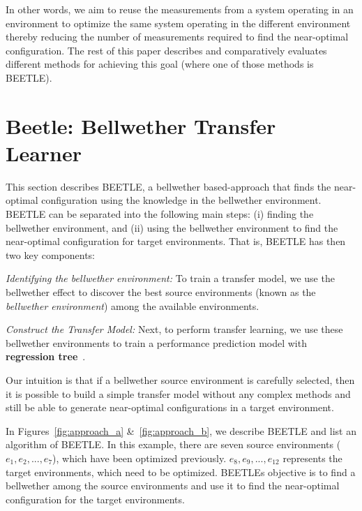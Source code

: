 \documentclass[10pt,journal,compsoc]{IEEEtran}
\begin{document}
In other words, we aim to reuse the measurements from a system operating in an environment to optimize the same system operating in the different environment thereby reducing the number of measurements required to find the near-optimal configuration.
The rest of this paper describes and comparatively evaluates
different methods for achieving this goal (where one of those
methods is  BEETLE).


\section{{\large Beetle: Bellwether Transfer Learner}}
\label{sect:beetle}



This section describes BEETLE, a bellwether based-approach that finds the near-optimal configuration using the knowledge in the bellwether environment. BEETLE can be separated into the following main steps: (i) finding the bellwether environment, and (ii) using the bellwether environment to find the near-optimal configuration for target environments. That is, BEETLE has then two key components:
\be
    \item \textit{Identifying the bellwether environment:} To train a transfer model, we use the bellwether effect to discover the best source environments (known as the \textit{bellwether environment}) among the available environments. 
    
    \item \textit{Construct the Transfer Model:} Next, to perform transfer learning, we use these bellwether environments to train a performance prediction model with \textbf{regression tree}~\cite{breiman1996bagging}.
\ee

Our intuition is that if a bellwether source environment is carefully selected, then it is possible to build a simple transfer model without any complex methods and still be able to generate near-optimal configurations in a target environment. 

In Figures~\ref{fig:approach_a} \&~\ref{fig:approach_b}, we describe BEETLE and list an algorithm of BEETLE. In this example, there are seven source environments ($e_1, e_2,..., e_7$), which have been optimized previously. $e_8, e_9,..., e_{12}$ represents the target environments, which need to be optimized. BEETLE\textquotesingle s objective is to find a bellwether among the source environments and use it to find the near-optimal configuration for the target environments. 
\end{document}
